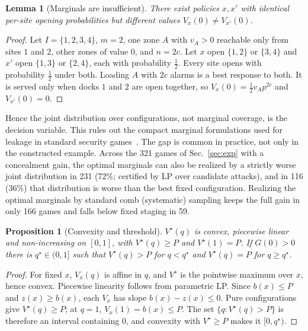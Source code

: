 \documentclass[10pt,twocolumn,letterpaper]{article}
\newtheorem{lemma}{Lemma}
\newtheorem{proposition}{Proposition}
\theoremstyle{remark}
\begin{document}
\begin{lemma}[Marginals are insufficient]\label{lem:marg}
There exist policies $x,x'$ with identical per-site opening probabilities but different values $V_x(0)\neq V_{x'}(0)$.
\end{lemma}
\begin{proof}
Let $I=\{1,2,3,4\}$, $m=2$, one zone $A$ with $v_A>0$ reachable only from sites $1$ and $2$, other zones of value $0$, and $n=2c$. Let $x$ open $\{1,2\}$ or $\{3,4\}$ and $x'$ open $\{1,3\}$ or $\{2,4\}$, each with probability $\tfrac12$. Every site opens with probability $\tfrac12$ under both. Loading $A$ with $2c$ alarms is a best response to both. It is served only when docks $1$ and $2$ are open together, so $V_x(0)=\tfrac12 v_Ap^{2c}$ and $V_{x'}(0)=0$.
\end{proof}
Hence the joint distribution over configurations, not marginal coverage, is the decision variable. This rules out the compact marginal formulations used for leakage in standard security games~\cite{xu2015leak}. The gap is common in practice, not only in the constructed example. Across the 321 games of Sec.~\ref{sec:exp} with a concealment gain, the optimal marginals can also be realized by a strictly worse joint distribution in 231 (72\%; certified by LP over candidate attacks), and in 116 (36\%) that distribution is worse than the best fixed configuration. Realizing the optimal marginals by standard comb (systematic) sampling keeps the full gain in only 166 games and falls below fixed staging in 59.

\begin{proposition}[Convexity and threshold]\label{prop:convex}
$V^\star(q)$ is convex, piecewise linear and non-increasing on $[0,1]$, with $V^\star(q)\ge P$ and $V^\star(1)=P$. If $G(0)>0$ there is $q^\star\in(0,1]$ such that $V^\star(q)>P$ for $q<q^\star$ and $V^\star(q)=P$ for $q\ge q^\star$.
\end{proposition}
\begin{proof}
For fixed $x$, $V_x(q)$ is affine in $q$, and $V^\star$ is the pointwise maximum over $x$, hence convex. Piecewise linearity follows from parametric LP. Since $b(x)\le P$ and $z(x)\ge b(x)$, each $V_x$ has slope $b(x)-z(x)\le0$. Pure configurations give $V^\star(q)\ge P$; at $q=1$, $V_x(1)=b(x)\le P$. The set $\{q:V^\star(q)>P\}$ is therefore an interval containing $0$, and convexity with $V^\star\ge P$ makes it $[0,q^\star)$.
\end{proof}
\end{document}
